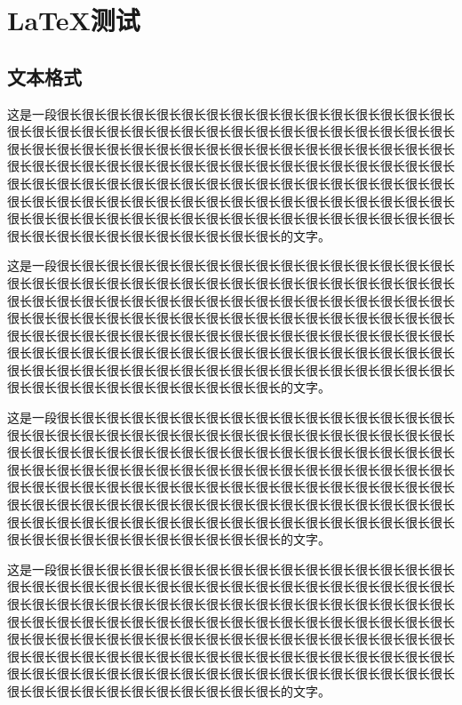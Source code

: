 \chapter{\LaTeX 测试}
\section{文本格式}
这是一段很长很长很长很长很长很长很长很长很长很长很长很长很长很长很长很长很长很长很长很长很长很长很长很长很长很长很长很长很长很长很长很长很长很长很长很长很长很长很长很长很长很长很长很长很长很长很长很长很长很长很长很长很长很长很长很长很长很长很长很长很长很长很长很长很长很长很长很长很长很长很长很长很长很长很长很长很长很长很长很长很长很长很长很长很长很长很长很长很长很长很长很长很长很长很长很长很长很长很长很长很长很长很长很长很长很长很长很长很长很长很长很长很长很长很长很长很长很长很长很长很长很长很长很长很长很长很长很长很长很长很长很长很长很长很长的文字。

这是一段很长很长很长很长很长很长很长很长很长很长很长很长很长很长很长很长很长很长很长很长很长很长很长很长很长很长很长很长很长很长很长很长很长很长很长很长很长很长很长很长很长很长很长很长很长很长很长很长很长很长很长很长很长很长很长很长很长很长很长很长很长很长很长很长很长很长很长很长很长很长很长很长很长很长很长很长很长很长很长很长很长很长很长很长很长很长很长很长很长很长很长很长很长很长很长很长很长很长很长很长很长很长很长很长很长很长很长很长很长很长很长很长很长很长很长很长很长很长很长很长很长很长很长很长很长很长很长很长很长很长很长很长很长很长很长的文字。

这是一段很长很长很长很长很长很长很长很长很长很长很长很长很长很长很长很长很长很长很长很长很长很长很长很长很长很长很长很长很长很长很长很长很长很长很长很长很长很长很长很长很长很长很长很长很长很长很长很长很长很长很长很长很长很长很长很长很长很长很长很长很长很长很长很长很长很长很长很长很长很长很长很长很长很长很长很长很长很长很长很长很长很长很长很长很长很长很长很长很长很长很长很长很长很长很长很长很长很长很长很长很长很长很长很长很长很长很长很长很长很长很长很长很长很长很长很长很长很长很长很长很长很长很长很长很长很长很长很长很长很长很长很长很长很长很长的文字。

这是一段很长很长很长很长很长很长很长很长很长很长很长很长很长很长很长很长很长很长很长很长很长很长很长很长很长很长很长很长很长很长很长很长很长很长很长很长很长很长很长很长很长很长很长很长很长很长很长很长很长很长很长很长很长很长很长很长很长很长很长很长很长很长很长很长很长很长很长很长很长很长很长很长很长很长很长很长很长很长很长很长很长很长很长很长很长很长很长很长很长很长很长很长很长很长很长很长很长很长很长很长很长很长很长很长很长很长很长很长很长很长很长很长很长很长很长很长很长很长很长很长很长很长很长很长很长很长很长很长很长很长很长很长很长很长很长的文字。

